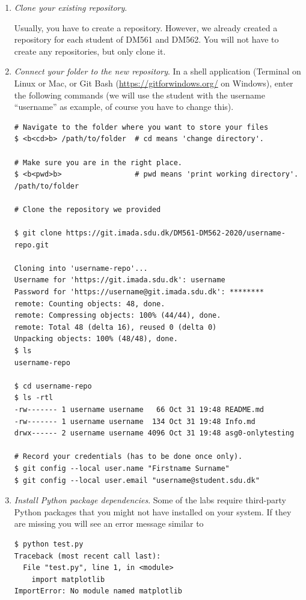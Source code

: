 \begin{enumerate}

\item \emph{Clone your existing repository}.

  Usually, you have to create a repository. However, we already created a repository for each student of DM561 and DM562. You will not have to create any repositories, but only clone it.
  
\item \emph{Connect your folder to the new repository}.
\label{step:connect-folder}\label{step:download-data}
In a shell application (Terminal on Linux or Mac, or Git Bash (\url{https://gitforwindows.org/} on Windows), enter the following commands (we will use the student with the username ``username'' as example, of course you have to change this).

\begin{lstlisting}
# Navigate to the folder where you want to store your files
$ <b<cd>b> /path/to/folder  # cd means 'change directory'.

# Make sure you are in the right place.
$ <b<pwd>b>                 # pwd means 'print working directory'.
/path/to/folder

# Clone the repository we provided

$ git clone https://git.imada.sdu.dk/DM561-DM562-2020/username-repo.git

Cloning into 'username-repo'...
Username for 'https://git.imada.sdu.dk': username
Password for 'https://username@git.imada.sdu.dk': ********
remote: Counting objects: 48, done.
remote: Compressing objects: 100% (44/44), done.
remote: Total 48 (delta 16), reused 0 (delta 0)
Unpacking objects: 100% (48/48), done.
$ ls 
username-repo

$ cd username-repo
$ ls -rtl
-rw------- 1 username username   66 Oct 31 19:48 README.md
-rw------- 1 username username  134 Oct 31 19:48 Info.md
drwx------ 2 username username 4096 Oct 31 19:48 asg0-onlytesting

# Record your credentials (has to be done once only).
$ git config --local user.name "Firstname Surname"
$ git config --local user.email "username@student.sdu.dk"
\end{lstlisting}


\item \emph{Install Python package dependencies}.
\label{step:install-dependencies}
Some of the labs require third-party Python packages that you might not have installed on your system. If they are missing you will see an error message similar to 
\begin{lstlisting}
$ python test.py 
Traceback (most recent call last):
  File "test.py", line 1, in <module>
    import matplotlib
ImportError: No module named matplotlib
\end{lstlisting}


\end{enumerate}
